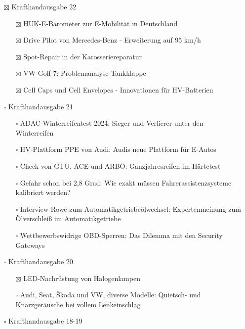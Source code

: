 \documentclass{vorlage-design-main}
\begin{document}
\begin{itemize}

\item[$\boxtimes$]
  Krafthandausgabe 22

  \begin{itemize}
  
  \item[$\boxtimes$]
    HUK-E-Barometer zur E-Mobilität in Deutschland
  \item[$\boxtimes$]
    Drive Pilot von Mercedes-Benz - Erweiterung auf 95 km/h
  \item[$\boxtimes$]
    Spot-Repair in der Karosseriereparatur
  \item[$\boxtimes$]
    VW Golf 7: Problemanalyse Tankklappe
  \item[$\boxtimes$]
    Cell Caps und Cell Envelopes - Innovationen für HV-Batterien
  \end{itemize}
\item[$\square$]
  Krafthandausgabe 21

  \begin{itemize}
  
  \item[$\square$]
    ADAC-Winterreifentest 2024: Sieger und Verlierer unter den
    Winterreifen
  \item[$\square$]
    HV-Plattform PPE von Audi: Audis neue Plattform für E-Autos
  \item[$\square$]
    Check von GTÜ, ACE und ARBÖ: Ganzjahresreifen im Härtetest
  \item[$\square$]
    Gefahr schon bei 2,8 Grad: Wie exakt müssen Fahrerassistenzsysteme
    kalibriert werden?
  \item[$\square$]
    Interview Rowe zum Automatikgetriebeölwechsel: Expertenmeinung zum
    Ölverschleiß im Automatikgetriebe
  \item[$\square$]
    Wettbewerbswidrige OBD-Sperren: Das Dilemma mit den Security
    Gateways
  \end{itemize}
\item[$\square$]
  Krafthandausgabe 20

  \begin{itemize}
  
  \item[$\boxtimes$]
    LED-Nachrüstung von Halogenlampen
  \item[$\square$]
    Audi, Seat, Škoda und VW, diverse Modelle: Quietsch- und
    Knarzgeräusche bei vollem Lenkeinschlag
  \end{itemize}
\item[$\square$]
  Krafthandausgabe 18-19


\end{itemize}
\end{document}
